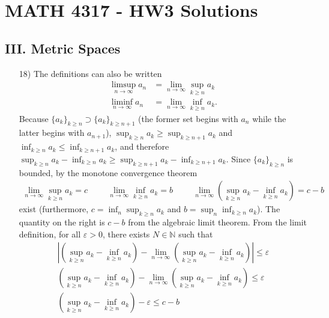 \documentclass[a4paper,12pt]{article}
\begin{document}
    \section*{MATH 4317 - HW3 Solutions}
    \subsection*{III. Metric Spaces}
    \begin{enumerate}
        \item[18)]
            The definitions can also be written
            \begin{align*}
                \limsup_{n \to \infty} a_n &= \lim_{n \to \infty} \sup_{k \geq n} a_k \\
                \liminf_{n \to \infty} a_n &= \lim_{n \to \infty} \inf_{k \geq n} a_k.
            \end{align*}
            Because $\{a_k\}_{k \geq n} \supset \{a_{k}\}_{k \geq n + 1}$ (the former set begins with $a_n$ while the latter begins with $a_{n + 1}$), $\sup_{k \geq n} a_k \geq \sup_{k \geq n + 1} a_k$ and $\inf_{k \geq n} a_k \leq \inf_{k \geq n + 1} a_k$, and therefore $\sup_{k \geq n} a_k - \inf_{k \geq n} a_k \geq \sup_{k \geq n + 1} a_k - \inf_{k \geq n + 1} a_k$. Since $\{a_k\}_{k \geq n}$ is bounded, by the monotone convergence theorem
            \begin{align*}
                \lim_{n \to \infty} \sup_{k \geq n} a_k = c \hspace{1cm} \lim_{n \to \infty} \inf_{k \geq n} a_k = b \hspace{1cm} \lim_{n \to \infty}(\sup_{k \geq n} a_k - \inf_{k \geq n} a_k) = c - b
            \end{align*}
            exist (furthermore, $c = \inf_{n} \sup_{k \geq n} a_k$ and $b = \sup_{n} \inf_{k \geq n} a_k$). The quantity on the right is $c - b$ from the algebraic limit theorem. From the limit definition, for all $\varepsilon > 0$, there exists $N \in \mathbb{N}$ such that
            \begin{gather*}
                |(\sup_{k \geq n} a_k - \inf_{k \geq n} a_k) - \lim_{n \to \infty}(\sup_{k \geq n} a_k - \inf_{k \geq n} a_k)| \leq \varepsilon \\
                (\sup_{k \geq n} a_k - \inf_{k \geq n} a_k) - \lim_{n \to \infty}(\sup_{k \geq n} a_k - \inf_{k \geq n} a_k) \leq \varepsilon \\
                (\sup_{k \geq n} a_k - \inf_{k \geq n} a_k) - \varepsilon \leq c - b
            \end{gather*}

\end{enumerate}
\end{document}

